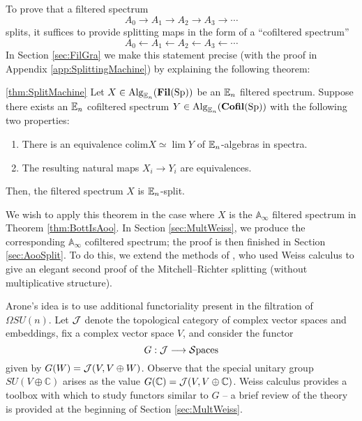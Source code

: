 To prove that a filtered spectrum
$$A_0 \longrightarrow A_1 \longrightarrow A_2 \longrightarrow A_3 \longrightarrow \cdots$$
splits, it suffices to provide splitting maps in the form of a ``cofiltered spectrum''
$$A_0 \longleftarrow A_1 \longleftarrow A_2 \longleftarrow A_3 \longleftarrow \cdots$$
In Section \ref{sec:FilGra} we make this statement precise (with the proof in Appendix \ref{app:SplittingMachine}) by explaining the following theorem:

\begin{customthm}{\ref{thm:SplitMachine}}%
Let $X\in \operatorname{\mathrm{Alg}}_{\operatorname{\mathbb{E}}_n}(\operatorname{\mathbf{Fil}}(\operatorname{\mathrm{Sp}}))$ be an $\operatorname{\mathbb{E}}_n$ filtered spectrum.  Suppose there exists an $\operatorname{\mathbb{E}}_n$ cofiltered spectrum $Y\in \operatorname{\mathrm{Alg}}_{\operatorname{\mathbb{E}}_n}(\operatorname{\mathbf{Cofil}}(\operatorname{\mathrm{Sp}}))$ with the following two properties:
\begin{enumerate}
\item There is an equivalence $\mathrm{colim } X \simeq \lim Y$ of $\operatorname{\mathbb{E}}_n$-algebras in spectra.
\item The resulting natural maps $X_i \to Y_i$ are equivalences.  
\end{enumerate}
Then, the filtered spectrum $X$ is $\operatorname{\mathbb{E}}_n$-split.
\end{customthm}

We wish to apply this theorem in the case where $X$ is the $\mathbb{A}_\infty$ filtered spectrum in Theorem \ref{thm:BottIsAoo}.  In Section \ref{sec:MultWeiss}, we produce the corresponding $\mathbb{A}_\infty$ cofiltered spectrum; the proof is then finished in Section \ref{sec:AooSplit}.  To do this, we extend the methods of \cite{Arone}, who used Weiss calculus to give an elegant second proof of the Mitchell--Richter splitting (without multiplicative structure).  

Arone's idea is to use additional functoriality present in the filtration of $\Omega SU(n)$.  Let $\operatorname{\mathcal{J}}$ denote the topological category of complex vector spaces and embeddings, fix a complex vector space $V$, and consider the functor $$G:\operatorname{\mathcal{J}} \longrightarrow \mathcal{S}\text{paces}$$
given by $G(W)=\operatorname{\mathcal{J}}(V,V \oplus W)$.  Observe that the special unitary group $SU(V \oplus \mathbb{C})$ arises as the value $G(\mathbb{C}) = \operatorname{\mathcal{J}} (V,V\oplus \mathbb{C})$.  Weiss calculus provides a toolbox with which to study functors similar to $G$ -- a brief review of the theory is provided at the beginning of Section \ref{sec:MultWeiss}.  

